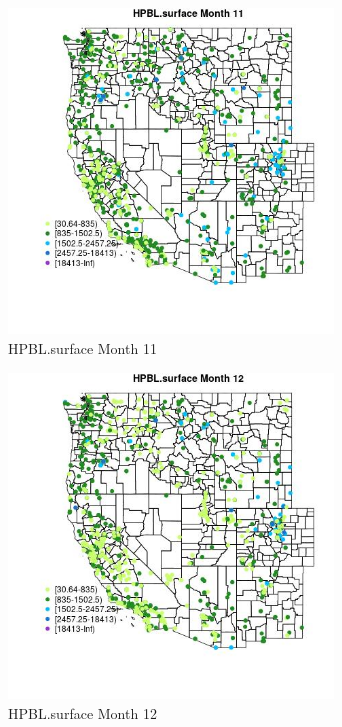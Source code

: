 \begin{figure} 
\centering  
\includegraphics[width=0.77\textwidth]{Code_Outputs/Report_ML_input_PM25_Step4_part_f_de_duplicated_aves_prioritize_24hr_obswNAs_MapObsMo11HPBLsurface.jpg} 
\caption{\label{fig:Report_ML_input_PM25_Step4_part_f_de_duplicated_aves_prioritize_24hr_obswNAsMapObsMo11HPBLsurface}HPBL.surface Month 11} 
\end{figure} 
 

\begin{figure} 
\centering  
\includegraphics[width=0.77\textwidth]{Code_Outputs/Report_ML_input_PM25_Step4_part_f_de_duplicated_aves_prioritize_24hr_obswNAs_MapObsMo12HPBLsurface.jpg} 
\caption{\label{fig:Report_ML_input_PM25_Step4_part_f_de_duplicated_aves_prioritize_24hr_obswNAsMapObsMo12HPBLsurface}HPBL.surface Month 12} 
\end{figure} 
 

